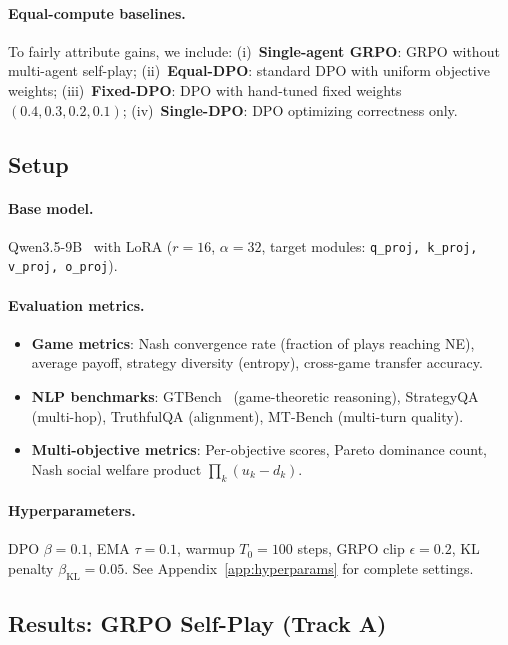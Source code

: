 \documentclass{article}
\newcommand{\KL}{\mathrm{KL}}
\begin{document}
\paragraph{Equal-compute baselines.}
To fairly attribute gains, we include:
(i)~\textbf{Single-agent GRPO}: GRPO without multi-agent self-play;
(ii)~\textbf{Equal-DPO}: standard DPO with uniform objective weights;
(iii)~\textbf{Fixed-DPO}: DPO with hand-tuned fixed weights $(0.4, 0.3, 0.2, 0.1)$;
(iv)~\textbf{Single-DPO}: DPO optimizing correctness only.

\subsection{Setup}

\paragraph{Base model.} Qwen3.5-9B~\citep{qwen2024qwen2} with LoRA ($r = 16$, $\alpha = 32$, target modules: \texttt{q\_proj, k\_proj, v\_proj, o\_proj}).

\paragraph{Evaluation metrics.}
\begin{itemize}
    \item \textbf{Game metrics}: Nash convergence rate (fraction of plays reaching NE), average payoff, strategy diversity (entropy), cross-game transfer accuracy.
    \item \textbf{NLP benchmarks}: GTBench~\citep{duan2024gtbench} (game-theoretic reasoning), StrategyQA (multi-hop), TruthfulQA (alignment), MT-Bench (multi-turn quality).
    \item \textbf{Multi-objective metrics}: Per-objective scores, Pareto dominance count, Nash social welfare product $\prod_k (u_k - d_k)$.
\end{itemize}

\paragraph{Hyperparameters.}
DPO $\beta = 0.1$, EMA $\tau = 0.1$, warmup $T_0 = 100$ steps, GRPO clip $\epsilon = 0.2$, KL penalty $\beta_{\KL} = 0.05$.
See Appendix~\ref{app:hyperparams} for complete settings.


\subsection{Results: GRPO Self-Play (Track A)}
\label{sec:exp1}
\end{document}

